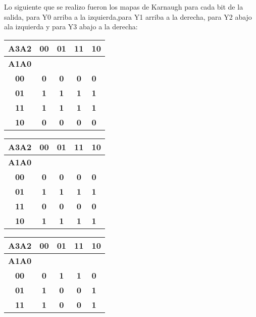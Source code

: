 \documentclass[english]{article}
\begin{document}
Lo siguiente que se realizo fueron los mapas de Karnaugh para cada bit de la salida, para Y0 arriba a la izquierda,para Y1 arriba a la derecha, para Y2 abajo ala izquierda y para Y3 abajo a la derecha:
\begin{table}[htb] 
\centering
\begin{tabular}{|c|c|c|c|l|}
\hline
\textbf{A3A2} & \textbf{00} & \textbf{01} & \textbf{11} & \textbf{10} \\ \hline
\textbf{A1A0} & \multicolumn{4}{c|}{\textbf{}}                        \\ \hline
\textbf{00}   & \textbf{0}  & \textbf{0}  & \textbf{0}  & \textbf{0}  \\ \hline
\textbf{01}   & \textbf{1}  & \textbf{1}  & \textbf{1}  & \textbf{1}  \\ \hline
\textbf{11}   & \textbf{1}  & \textbf{1}  & \textbf{1}  & \textbf{1}  \\ \hline
\textbf{10}   & \textbf{0}  & \textbf{0}  & \textbf{0}  & \textbf{0}  \\ \hline
\end{tabular}
\begin{tabular}{|c|c|c|c|l|}
\hline
\textbf{A3A2} & \textbf{00} & \textbf{01} & \textbf{11} & \textbf{10} \\ \hline
\textbf{A1A0} & \multicolumn{4}{c|}{\textbf{}}                        \\ \hline
\textbf{00}   & \textbf{0}  & \textbf{0}  & \textbf{0}  & \textbf{0}  \\ \hline
\textbf{01}   & \textbf{1}  & \textbf{1}  & \textbf{1}  & \textbf{1}  \\ \hline
\textbf{11}   & \textbf{0}  & \textbf{0}  & \textbf{0}  & \textbf{0}  \\ \hline
\textbf{10}   & \textbf{1}  & \textbf{1}  & \textbf{1}  & \textbf{1}  \\ \hline
\end{tabular}
\begin{tabular}{|c|c|c|c|l|}
\hline
\textbf{A3A2} & \textbf{00} & \textbf{01} & \textbf{11} & \textbf{10} \\ \hline
\textbf{A1A0} & \multicolumn{4}{c|}{\textbf{}}                        \\ \hline
\textbf{00}   & \textbf{0}  & \textbf{1}  & \textbf{1}  & \textbf{0}  \\ \hline
\textbf{01}   & \textbf{1}  & \textbf{0}  & \textbf{0}  & \textbf{1}  \\ \hline
\textbf{11}   & \textbf{1}  & \textbf{0}  & \textbf{0}  & \textbf{1}  \\ \hline

\end{tabular}
\end{table}
\end{document}
